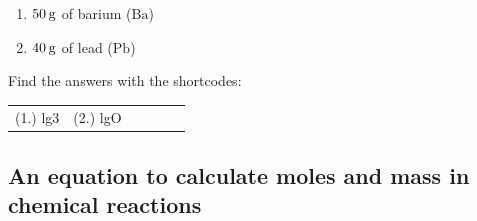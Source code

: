 \begin{enumerate}[noitemsep, label=\textbf{\arabic*}. ]
\begin{enumerate}[noitemsep, label=\textbf{\alph*}. ]
\label{m38717*uid22}\item \begin{math}50\phantom{\rule{2pt}{0ex}}\mathrm{g}\end{math} of barium (\begin{math}\mathrm{Ba}\end{math})
\label{m38717*uid23}\item \begin{math}40\phantom{\rule{2pt}{0ex}}\mathrm{g}\end{math} of lead (\begin{math}\mathrm{Pb}\end{math})
\end{enumerate}
                \end{enumerate}
        
      

    
    \label{m38717*cid4}
\par {} Find the answers with the shortcodes:
 \par \begin{tabular}[h]{cccccc}
 (1.) lg3  &  (2.) lgO  & \end{tabular}



            \subsection{ An equation to calculate moles and mass in chemical reactions}
            \nopagebreak
            
